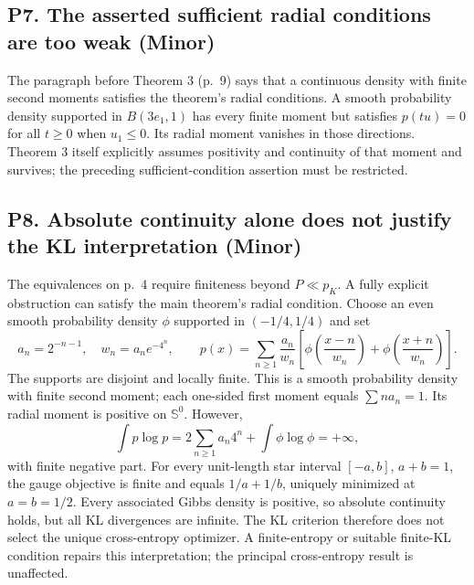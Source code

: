 \documentclass[10pt]{article}
\begin{document}
\subsection*{P7. The asserted sufficient radial conditions are too weak (Minor)}
The paragraph before Theorem 3 (p. 9) says that a continuous density with finite second moments satisfies the theorem’s radial conditions. A smooth probability density supported in \(B(3e_1,1)\) has every finite moment but satisfies \(p(tu)=0\) for all \(t\ge0\) when \(u_1\le0\). Its radial moment vanishes in those directions. Theorem 3 itself explicitly assumes positivity and continuity of that moment and survives; the preceding sufficient-condition assertion must be restricted.\par
\subsection*{P8. Absolute continuity alone does not justify the KL interpretation (Minor)}
The equivalences on p. 4 require finiteness beyond \(P\ll p_K\). A fully explicit obstruction can satisfy the main theorem’s radial condition. Choose an even smooth probability density \(\phi\) supported in \((-1/4,1/4)\) and set \[a_n=2^{-n-1},\quad w_n=a_ne^{-4^n},\qquad
p(x)=\sum_{n\ge1}\frac{a_n}{w_n}
 \left[\phi\!\left(\frac{x-n}{w_n}\right)+
       \phi\!\left(\frac{x+n}{w_n}\right)\right].\] The supports are disjoint and locally finite. This is a smooth probability density with finite second moment; each one-sided first moment equals \(\sum n a_n=1\). Its radial moment is positive on \(\mathbb S^0\). However, \[\int p\log p=2\sum_{n\ge1}a_n4^n+\int\phi\log\phi=+\infty ,\] with finite negative part. For every unit-length star interval \([-a,b]\), \(a+b=1\), the gauge objective is finite and equals \(1/a+1/b\), uniquely minimized at \(a=b=1/2\). Every associated Gibbs density is positive, so absolute continuity holds, but all KL divergences are infinite. The KL criterion therefore does not select the unique cross-entropy optimizer. A finite-entropy or suitable finite-KL condition repairs this interpretation; the principal cross-entropy result is unaffected.\par
\end{document}
